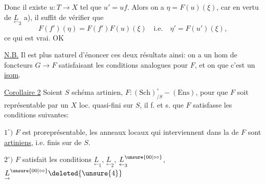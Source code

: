 Donc il existe $u:T\to X$ tel que $u'=uf$. Alors on a  $\eta=F(u)(\xi)$, car en vertu de $\underset{\leftarrow}{L}_3$ a), il suffit de vérifier que
\[
F(f')(\eta)=F(f')F(u)(\xi)\quad\text{i.e.}\quad\eta'=F(u')(\xi),
\]
ce qui est vrai.
\hfill OK

\uline{N.B.} Il est plus naturel d'énoncer ces deux résultats ainsi: on a un hom de foncteurs $G\to F$ satisfaisant les conditions analogues pour $F$, et on  que c'est un \uline{isom}.

\uline{Corollaire 2} Soient $S$ schéma artinien, $F:(\mathrm{Sch})_{/S}^{\circ}\mathbin{-}(\mathrm{Ens})$, pour que $F$ soit représentable par un $X$ loc. quasi-fini sur $S$, il f. et s. que $F$ satisfasse les conditions suivantes:

$1^\circ)$ $F$ est proreprésentable, les anneaux locaux qui interviennent dans la  de $F$ sont  \uline{artiniens}, i.e. finis sur  de $S$.

$2^\circ)$ $F$ satisfait les conditions $\underset{\leftarrow}{L}_1$, $\underset{\leftarrow}{L}_2$, $\underset{\leftarrow}{L}_3^{\unsure{00|\circ\circ}}$, $\underset{\rightarrow}{L}^{\unsure{00|\circ\circ}}\deleted{\unsure{4}}$

